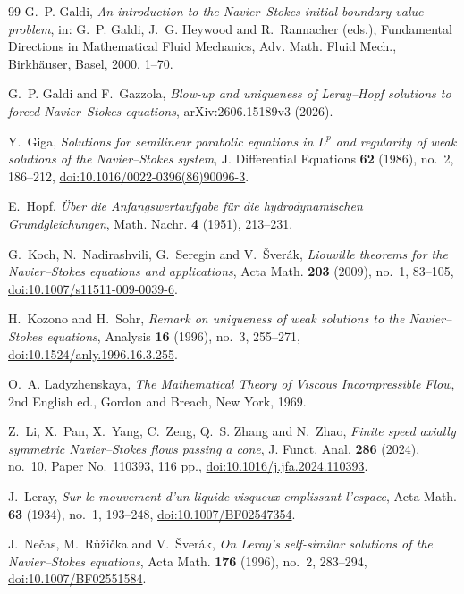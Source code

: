 \documentclass[10pt]{amsart}
\theoremstyle{definition}
\begin{document}
\begin{thebibliography}{99}
G.~P. Galdi,
\emph{An introduction to the Navier--Stokes initial-boundary value problem},
in: G.~P. Galdi, J.~G. Heywood and R.~Rannacher (eds.),
Fundamental Directions in Mathematical Fluid Mechanics,
Adv. Math. Fluid Mech., Birkh\"auser, Basel, 2000, 1--70.

G.~P. Galdi and F.~Gazzola,
\emph{Blow-up and uniqueness of Leray--Hopf solutions to forced Navier--Stokes
equations},
arXiv:2606.15189v3 (2026).

Y.~Giga,
\emph{Solutions for semilinear parabolic equations in $L^p$ and regularity of
weak solutions of the Navier--Stokes system},
J. Differential Equations \textbf{62} (1986), no.~2, 186--212,
\href{https://doi.org/10.1016/0022-0396(86)90096-3}{doi:10.1016/0022-0396(86)90096-3}.

E.~Hopf,
\emph{\"Uber die Anfangswertaufgabe f\"ur die hydrodynamischen Grundgleichungen},
Math. Nachr. \textbf{4} (1951), 213--231.

G.~Koch, N.~Nadirashvili, G.~Seregin and V.~\v{S}ver\'ak,
\emph{Liouville theorems for the Navier--Stokes equations and applications},
Acta Math. \textbf{203} (2009), no.~1, 83--105,
\href{https://doi.org/10.1007/s11511-009-0039-6}{doi:10.1007/s11511-009-0039-6}.

H.~Kozono and H.~Sohr,
\emph{Remark on uniqueness of weak solutions to the Navier--Stokes equations},
Analysis \textbf{16} (1996), no.~3, 255--271,
\href{https://doi.org/10.1524/anly.1996.16.3.255}{doi:10.1524/anly.1996.16.3.255}.

O.~A. Ladyzhenskaya,
\emph{The Mathematical Theory of Viscous Incompressible Flow},
2nd English ed., Gordon and Breach, New York, 1969.

Z.~Li, X.~Pan, X.~Yang, C.~Zeng, Q.~S. Zhang and N.~Zhao,
\emph{Finite speed axially symmetric Navier--Stokes flows passing a cone},
J. Funct. Anal. \textbf{286} (2024), no.~10, Paper No.~110393, 116 pp.,
\href{https://doi.org/10.1016/j.jfa.2024.110393}{doi:10.1016/j.jfa.2024.110393}.

J.~Leray,
\emph{Sur le mouvement d'un liquide visqueux emplissant l'espace},
Acta Math. \textbf{63} (1934), no.~1, 193--248,
\href{https://doi.org/10.1007/BF02547354}{doi:10.1007/BF02547354}.

J.~Ne\v{c}as, M.~R\r{u}\v{z}i\v{c}ka and V.~\v{S}ver\'ak,
\emph{On Leray's self-similar solutions of the Navier--Stokes equations},
Acta Math. \textbf{176} (1996), no.~2, 283--294,
\href{https://doi.org/10.1007/BF02551584}{doi:10.1007/BF02551584}.


\end{thebibliography}
\end{document}
